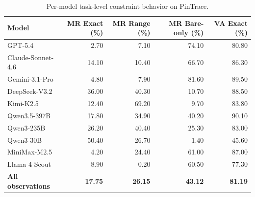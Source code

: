\begin{table}[t]
\small
\centering
\caption{Per-model task-level constraint behavior on PinTrace.}
\label{tab:rq1_model_variation}
\begin{tabular}{lrrrr}
\toprule
Model & MR Exact (\%) & MR Range (\%) & MR Bare-only (\%) & VA Exact (\%) \\
\midrule
GPT-5.4 & 2.70 & 7.10 & 74.10 & 80.80 \\
Claude-Sonnet-4.6 & 14.10 & 10.40 & 66.70 & 86.30 \\
Gemini-3.1-Pro & 4.80 & 7.90 & 81.60 & 89.50 \\
DeepSeek-V3.2 & 36.00 & 40.30 & 10.70 & 88.50 \\
Kimi-K2.5 & 12.40 & 69.20 & 9.70 & 83.80 \\
Qwen3.5-397B & 17.80 & 34.90 & 40.20 & 90.10 \\
Qwen3-235B & 26.20 & 40.40 & 25.30 & 83.00 \\
Qwen3-30B & 50.40 & 26.70 & 1.40 & 45.60 \\
MiniMax-M2.5 & 4.20 & 24.40 & 61.00 & 87.00 \\
Llama-4-Scout & 8.90 & 0.20 & 60.50 & 77.30 \\
\midrule
\textbf{All observations} & \textbf{17.75} & \textbf{26.15} & \textbf{43.12} & \textbf{81.19} \\
\bottomrule
\end{tabular}
\end{table}
